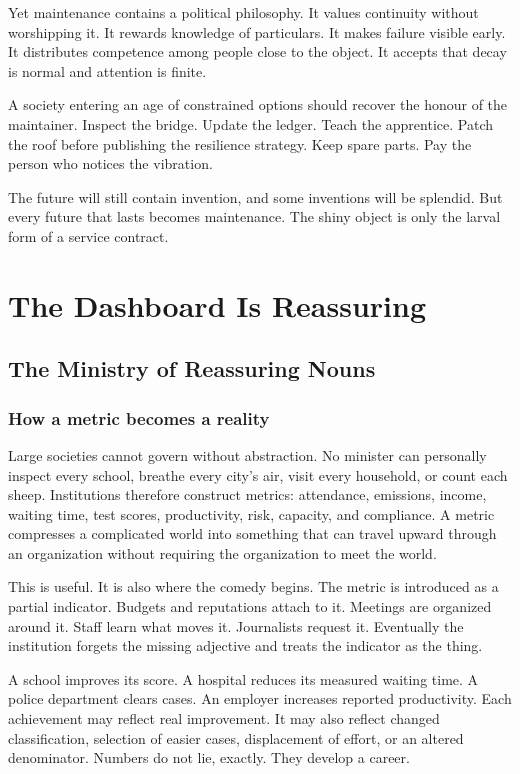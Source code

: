 \documentclass[12pt,a4paper]{book}
\begin{document}
Yet maintenance contains a political philosophy.  It values continuity
without worshipping it.  It rewards knowledge of particulars.  It makes
failure visible early.  It distributes competence among people close to the
object.  It accepts that decay is normal and attention is finite.

A society entering an age of constrained options should recover the honour of
the maintainer.  Inspect the bridge.  Update the ledger.  Teach the apprentice.
Patch the roof before publishing the resilience strategy.  Keep spare parts.
Pay the person who notices the vibration.

The future will still contain invention, and some inventions will be splendid.
But every future that lasts becomes maintenance.  The shiny object is only the
larval form of a service contract.

\part{The Dashboard Is Reassuring}

\chapter{The Ministry of Reassuring Nouns}
\label{chap:ministry-reassuring-nouns}

\section{How a metric becomes a reality}

Large societies cannot govern without abstraction.  No minister can personally
inspect every school, breathe every city's air, visit every household, or count
each sheep.  Institutions therefore construct metrics: attendance, emissions,
income, waiting time, test scores, productivity, risk, capacity, and compliance.
A metric compresses a complicated world into something that can travel upward
through an organization without requiring the organization to meet the world.

This is useful.  It is also where the comedy begins.  The metric is introduced
as a partial indicator.  Budgets and reputations attach to it.  Meetings are
organized around it.  Staff learn what moves it.  Journalists request it.
Eventually the institution forgets the missing adjective and treats the
indicator as the thing.

A school improves its score.  A hospital reduces its measured waiting time.  A
police department clears cases.  An employer increases reported productivity.
Each achievement may reflect real improvement.  It may also reflect changed
classification, selection of easier cases, displacement of effort, or an
altered denominator.  Numbers do not lie, exactly.  They develop a career.
\end{document}
